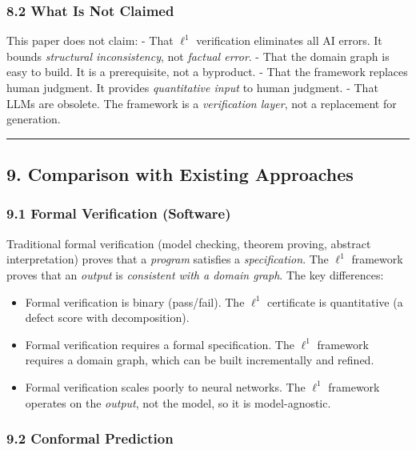 \documentclass[
]{article}
\providecommand{\tightlist}{%
  \setlength{\itemsep}{0pt}\setlength{\parskip}{0pt}}
\begin{document}
\subsubsection{8.2 What Is Not Claimed}\label{what-is-not-claimed}

This paper does not claim: - That \(\ell^1\) verification eliminates all
AI errors. It bounds \emph{structural inconsistency}, not \emph{factual
error}. - That the domain graph is easy to build. It is a prerequisite,
not a byproduct. - That the framework replaces human judgment. It
provides \emph{quantitative input} to human judgment. - That LLMs are
obsolete. The framework is a \emph{verification layer}, not a
replacement for generation.

\begin{center}\rule{0.5\linewidth}{0.5pt}\end{center}

\subsection{9. Comparison with Existing
Approaches}\label{comparison-with-existing-approaches}

\subsubsection{9.1 Formal Verification
(Software)}\label{formal-verification-software}

Traditional formal verification (model checking, theorem proving,
abstract interpretation) proves that a \emph{program} satisfies a
\emph{specification}. The \(\ell^1\) framework proves that an
\emph{output} is \emph{consistent with a domain graph}. The key
differences:

\begin{itemize}
\tightlist
\item
  Formal verification is binary (pass/fail). The \(\ell^1\) certificate
  is quantitative (a defect score with decomposition).
\item
  Formal verification requires a formal specification. The \(\ell^1\)
  framework requires a domain graph, which can be built incrementally
  and refined.
\item
  Formal verification scales poorly to neural networks. The \(\ell^1\)
  framework operates on the \emph{output}, not the model, so it is
  model-agnostic.
\end{itemize}

\subsubsection{9.2 Conformal Prediction}\label{conformal-prediction}
\end{document}
